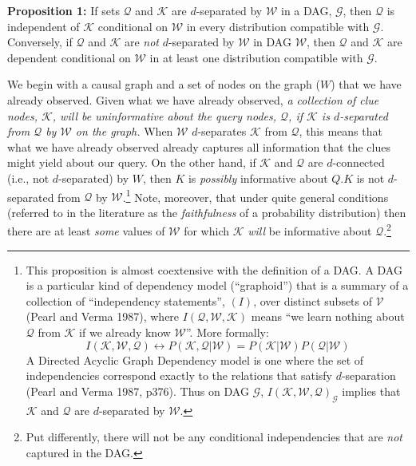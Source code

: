 \documentclass[12pt,]{book}
\let\rmarkdownfootnote\footnote%
\def\footnote{\protect\rmarkdownfootnote}
\begin{document}
\textbf{Proposition 1:} If sets \(\mathcal Q\) and \(\mathcal K\) are \(d\)-separated by \(\mathcal W\) in a DAG, \(\mathcal G\), then \(\mathcal Q\) is independent of \(\mathcal K\) conditional on \(\mathcal W\) in every distribution compatible with \(\mathcal G\). Conversely, if \(\mathcal Q\) and \(\mathcal K\) are \emph{not} \(d\)-separated by \(\mathcal W\) in DAG \(\mathcal W\), then \(\mathcal Q\) and \(\mathcal K\) are dependent conditional on \(\mathcal W\) in at least one distribution compatible with \(\mathcal G\).

We begin with a causal graph and a set of nodes on the graph (\(W\)) that we have already observed. Given what we have already observed, \emph{a collection of clue nodes, \(\mathcal K\), will be uninformative about the query nodes, \(\mathcal Q\), if \(\mathcal K\) is \(d\)-separated from \(\mathcal Q\) by \(\mathcal W\) on the graph.} When \(\mathcal W\) \(d\)-separates \(\mathcal K\) from \(\mathcal Q\), this means that what we have already observed already captures all information that the clues might yield about our query. On the other hand, if \(\mathcal K\) and \(\mathcal Q\) are \(d\)-connected (i.e., not \(d\)-separated) by \(W\), then \(K\) is \emph{possibly} informative about \(Q\).\(K\) is not \(d\)-separated from \(\mathcal Q\) by \(\mathcal W\).\footnote{This proposition is almost coextensive with the definition of a DAG. A DAG is a particular kind of dependency model (``graphoid'') that is a summary of a collection of ``independency statements'', \((I)\), over distinct subsets of \(\mathcal V\) (Pearl and Verma 1987), where \(I(\mathcal Q,\mathcal W,\mathcal K)\) means ``we learn nothing about \(\mathcal Q\) from \(\mathcal K\) if we already know \(\mathcal W\)''. More formally:
  \[I(\mathcal K, \mathcal W,\mathcal Q) \leftrightarrow P(\mathcal K,\mathcal Q|\mathcal W)=P(\mathcal K|\mathcal W)P(\mathcal Q|\mathcal W)\]
  A Directed Acyclic Graph Dependency model is one where the set of independencies correspond exactly to the relations that satisfy \(d\)-separation (Pearl and Verma 1987, p376). Thus on DAG \(\mathcal G\), \(I(\mathcal K,\mathcal W,\mathcal Q)_\mathcal G\) implies that \(\mathcal K\) and \(\mathcal Q\) are \(d\)-separated by \(\mathcal W\).} Note, moreover, that under quite general conditions (referred to in the literature as the \emph{faithfulness} of a probability distribution) then there are at least \emph{some} values of \(\mathcal W\) for which \(\mathcal K\) \emph{will} be informative about \(\mathcal Q\).\footnote{Put differently, there will not be any conditional independencies that are \emph{not} captured in the DAG.}
\end{document}
